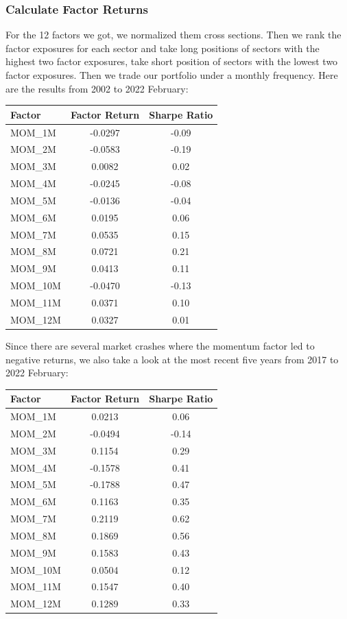 \documentclass{article}
\begin{document}
\subsubsection{Calculate Factor Returns}
For the 12 factors we got, we normalized them cross sections. Then we rank the factor exposures for each sector and take long positions of sectors with the highest two factor exposures, take short position of sectors with the lowest two factor exposures. Then we trade our portfolio under a monthly frequency. Here are the results from 2002 to 2022 February:
\begin{center}
\begin{tabular}{|l|S[table-format=3.1(3)]|S[table-format=3.1(3)]|}
\hline
{Factor}&{Factor Return}&{Sharpe Ratio} \\
\hline
{MOM\_1M} & -0.0297 & -0.09  \\\hline
{MOM\_2M} & -0.0583 & -0.19  \\ \hline
{MOM\_3M} & 0.0082 & 0.02  \\ \hline
{MOM\_4M} & -0.0245 & -0.08  \\ \hline
{MOM\_5M} & -0.0136 & -0.04  \\ \hline
{MOM\_6M} & 0.0195 & 0.06  \\ \hline
{MOM\_7M} & 0.0535 & 0.15  \\ \hline
{MOM\_8M} & 0.0721 & 0.21  \\ \hline
{MOM\_9M} & 0.0413 & 0.11  \\ \hline
{MOM\_10M} & -0.0470 & -0.13  \\ \hline
{MOM\_11M} & 0.0371 & 0.10  \\ \hline
{MOM\_12M} & 0.0327 & 0.01 \\ \hline
\end{tabular}
\end{center}
Since there are several market crashes where the momentum factor led to negative returns, we also take a look at the most recent five years from 2017 to 2022 February:
\begin{center}
\begin{tabular}{|l|S[table-format=3.1(3)]|S[table-format=3.1(3)]|}
\hline
{Factor}&{Factor Return}&{Sharpe Ratio} \\
\hline
{MOM\_1M} & 0.0213 & 0.06  \\\hline
{MOM\_2M} & -0.0494 & -0.14  \\ \hline
{MOM\_3M} & 0.1154 & 0.29  \\ \hline
{MOM\_4M} & -0.1578 & 0.41  \\ \hline
{MOM\_5M} & -0.1788 & 0.47  \\ \hline
{MOM\_6M} & 0.1163 & 0.35  \\ \hline
{MOM\_7M} & 0.2119 & 0.62  \\ \hline
{MOM\_8M} & 0.1869 & 0.56  \\ \hline
{MOM\_9M} & 0.1583 & 0.43  \\ \hline
{MOM\_10M} & 0.0504 & 0.12  \\ \hline
{MOM\_11M} & 0.1547 & 0.40  \\ \hline
{MOM\_12M} & 0.1289 & 0.33 \\ \hline
\end{tabular}
\end{center}
\end{document}

